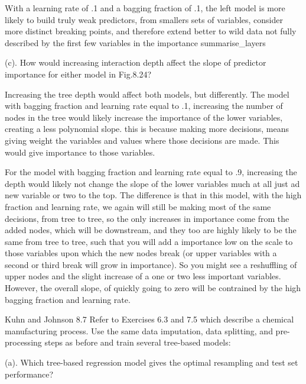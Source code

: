 \documentclass[]{report}
\begin{document}
With a learning rate of .1 and a bagging fraction of .1, the left model
is more likely to build truly weak predictors, from smallers sets of
variables, consider more distinct breaking points, and therefore extend
better to wild data not fully described by the first few variables in
the importance summarise\_layers

\begin{subquestion}{(c).} How would increasing interaction depth affect the slope of predictor importance for either model in Fig.8.24?\end{subquestion}

Increasing the tree depth would affect both models, but differently. The
model with bagging fraction and learning rate equal to .1, increasing
the number of nodes in the tree would likely increase the importance of
the lower variables, creating a less polynomial slope. this is because
making more decisions, means giving weight the variables and values
where those decisions are made. This would give importance to those
variables.

For the model with bagging fraction and learning rate equal to .9,
increasing the depth would likely not change the slope of the lower
variables much at all just ad new variable or two to the top. The
difference is that in this model, with the high fraction and learning
rate, we again will still be making most of the same decisions, from
tree to tree, so the only increases in importance come from the added
nodes, which will be downstream, and they too are highly likely to be
the same from tree to tree, such that you will add a importance low on
the scale to those variables upon which the new nodes break (or upper
variables with a second or third break will grow in importance). So you
might see a reshuffling of upper nodes and the slight increase of a one
or two less important variables. However, the overall slope, of quickly
going to zero will be contrained by the high bagging fraction and
learning rate.


\begin{question}{Kuhn and Johnson 8.7}
Refer to Exercises 6.3 and 7.5 which describe a chemical manufacturing process. Use the same data imputation, data splitting, and pre-processing steps as before and train several tree-based models:
\end{question}

\begin{subquestion}{(a).} Which tree-based regression model gives the optimal resampling and test set performance? \end{subquestion}
\end{document}
